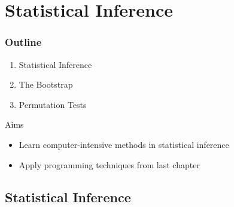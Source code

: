 \section{Statistical Inference}

\begin{frame}
	\frametitle{Outline}
	
	\begin{enumerate}
		\item Statistical Inference
		\item The Bootstrap
		\item Permutation Tests
	\end{enumerate}
	
	\vfill
	
	\begin{block}{Aims}
		\begin{itemize}
			\item Learn computer-intensive methods in statistical inference
			\item Apply programming techniques from last chapter
		\end{itemize}
	\end{block}
\end{frame}

\subsection{Statistical Inference}

